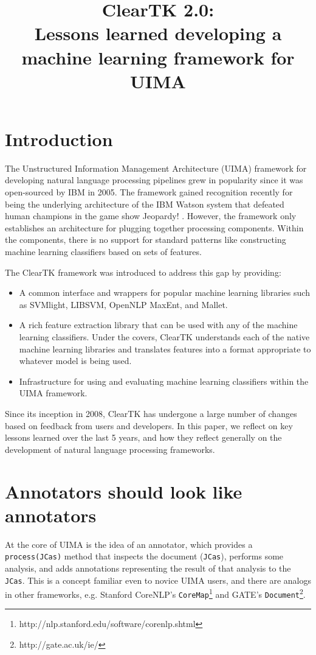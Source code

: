 \documentclass[10pt, a4paper]{article}
\title{ClearTK 2.0:\\ Lessons learned developing a machine learning framework for UIMA}
\newcommand{\code}[1]{\texttt{\small #1}}
\begin{document}
\maketitleabstract

\section{Introduction}
The Unstructured Information Management Architecture (UIMA) framework for developing natural language processing pipelines grew in popularity since it was open-sourced by IBM in 2005.
The framework gained recognition recently for being the underlying architecture of the IBM Watson system that defeated human champions in the game show Jeopardy! \cite{ferrucci_building_2010}.
However, the framework only establishes an architecture for plugging together processing components.
Within the components, there is no support for standard patterns like constructing machine learning classifiers based on sets of features.

The ClearTK framework was introduced to address this gap \cite{ogren-etal:2008:UIMA-LREC,ogren-etal:2009:UIMA-GSCL} by providing:
\begin{itemize}
\item A common interface and wrappers for popular machine learning libraries such as SVMlight, LIBSVM, OpenNLP MaxEnt, and Mallet.
\item A rich feature extraction library that can be used with any of the machine learning classifiers. Under the covers, ClearTK understands each of the native machine learning libraries and translates features into a format appropriate to whatever model is being used.
\item Infrastructure for using and evaluating machine learning classifiers within the UIMA framework.
\end{itemize}

Since its inception in 2008, ClearTK has undergone a large number of changes based on feedback from users and developers.
In this paper, we reflect on key lessons learned over the last 5 years, and how they reflect generally on the development of natural language processing frameworks.

\section{Annotators should look like annotators}
\label{sec:annotators}
At the core of UIMA is the idea of an annotator, which provides a \code{process(JCas)} method that inspects the document (\code{JCas}), performs some analysis, and adds annotations representing the result of that analysis to the \code{JCas}.
This is a concept familiar even to novice UIMA users, and there are analogs in other frameworks, e.g. Stanford CoreNLP's \code{CoreMap}\footnote{http://nlp.stanford.edu/software/corenlp.shtml} and GATE's \code{Document}\footnote{http://gate.ac.uk/ie/}.
\end{document}

